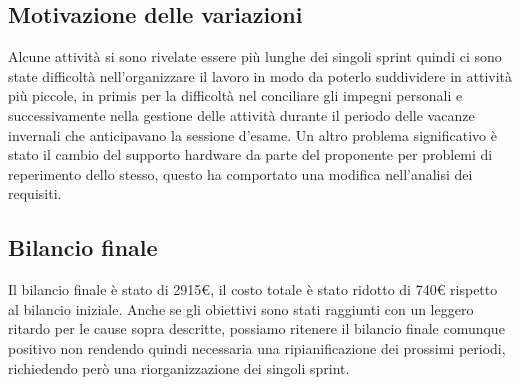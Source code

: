 \subsection{Motivazione delle variazioni}

Alcune attività si sono rivelate essere più lunghe dei singoli sprint quindi ci sono state difficoltà nell'organizzare il lavoro in modo da poterlo suddividere in attività più piccole, in primis per la difficoltà nel conciliare gli impegni personali e successivamente nella gestione delle attività durante il periodo delle vacanze invernali che anticipavano la sessione d'esame.  
Un altro problema significativo è stato il cambio del supporto hardware da parte del proponente per problemi di reperimento dello stesso, questo ha comportato una modifica nell'analisi dei requisiti.

\subsection{Bilancio finale}

Il bilancio finale è stato di 2915€, il costo totale è stato ridotto di 740€ rispetto al bilancio iniziale. Anche se gli obiettivi sono stati raggiunti con un leggero ritardo per le cause sopra descritte, possiamo ritenere il bilancio finale comunque positivo non rendendo quindi necessaria una ripianificazione dei prossimi periodi, richiedendo però una riorganizzazione dei singoli sprint.